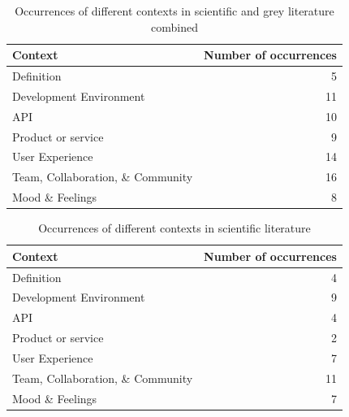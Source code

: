 \documentclass[english, 12pt, a4paper, sci, utf8, a-1b, online]{aaltothesis}
\begin{document}
\begin{table}[ht]
  \begin{center}
    \begin{tabular}{l r}
      Context                           & Number of occurrences \\
      \hline
      Definition                        & 5                    \\
      Development Environment           & 11                   \\
      API                               & 10                   \\
      Product or service                & 9                    \\
      User Experience                   & 14                   \\
      Team, Collaboration, \& Community & 16                   \\
      Mood \& Feelings                  & 8                    \\
      \hline
    \end{tabular}
    \caption{Occurrences of different contexts in scientific and grey literature combined}
  \end{center}
\end{table}

\begin{table}[ht]
  \begin{center}
    \begin{tabular}{l r}
      Context                           & Number of occurrences \\
      \hline
      Definition                        & 4                    \\
      Development Environment           & 9                    \\
      API                               & 4                    \\
      Product or service                & 2                    \\
      User Experience                   & 7                    \\
      Team, Collaboration, \& Community & 11                   \\
      Mood \& Feelings                  & 7                    \\
      \hline
    \end{tabular}
    \caption{Occurrences of different contexts in scientific literature}
  \end{center}
\end{table}
\end{document}
